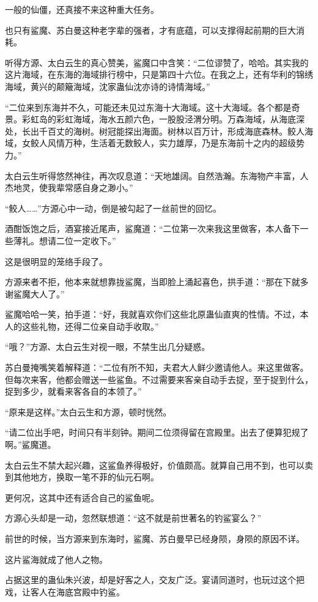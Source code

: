 \begin{this_body}
一般的仙僵，还真接不来这种重大任务。

也只有鲨魔、苏白曼这种老字辈的强者，才有底蕴，可以支撑得起前期的巨大消耗。

听得方源、太白云生的真心赞美，鲨魔口中含笑：“二位谬赞了，哈哈。其实我的这片海域，在东海的海域排行榜中，只是第四十六位。在我之上，还有华利的锦绣海域，黄兴的颠簸海域，沈家蛊仙沈亦诗的诗情海域。”

“二位来到东海并不久，可能还未见过东海十大海域。这十大海域。各个都是奇景。彩虹岛的彩虹海域，海水五颜六色，一股股泾渭分明。万森海域，从海底深处，长出千百丈的海树。树冠能探出海面。树林以百万计，形成海底森林。鲛人海域，女鲛人风情万种，生活着无数鲛人，实力雄厚，乃是东海前十之内的超级势力。”

太白云生听得悠然神往，再次叹息道：“天地雄阔。自然浩瀚。东海物产丰富，人杰地灵，使我辈常感自身之渺小。”

“鲛人……”方源心中一动，倒是被勾起了一丝前世的回忆。

酒酣饭饱之后，酒宴接近尾声，鲨魔道：“二位第一次来我这里做客，本人备下一些薄礼。想请二位一定收下。”

这是很明显的笼络手段了。

方源来者不拒，他本来就想靠拢鲨魔，当即脸上涌起喜色，拱手道：“那在下就多谢鲨魔大人了。”

鲨魔哈哈一笑，拍手道：“好，我就喜欢你们这些北原蛊仙直爽的性情。不过，本人的这些礼物，还得二位亲自动手收取。”

“哦？”方源、太白云生对视一眼，不禁生出几分疑惑。

苏白曼掩嘴笑着解释道：“二位有所不知，夫君大人鲜少邀请他人。来这里做客。但每次来客，他都会赠送一些鲨鱼。不过需要来客亲自动手去捉，至于捉到什么，捉到多少，就看来客各自的本领了。”

“原来是这样。”太白云生和方源，顿时恍然。

“请二位出手吧，时间只有半刻钟。期间二位须得留在宫殿里。出去了便算犯规了啊。”鲨魔道。

太白云生不禁大起兴趣，这鲨鱼养得极好，价值颇高。就算自己用不到，也可以卖到其他地方，换取一笔不菲的仙元石啊。

更何况，这其中还有适合自己的鲨鱼呢。

方源心头却是一动，忽然联想道：“这不就是前世著名的钓鲨宴么？”

前世的时候，当方源来到东海时，鲨魔、苏白曼早已经身陨，身陨的原因不详。

这片鲨海就成了他人之物。

占据这里的蛊仙朱兴波，却是好客之人，交友广泛。宴请同道时，也玩过这个把戏，让客人在海底宫殿中钓鲨。


\end{this_body}
